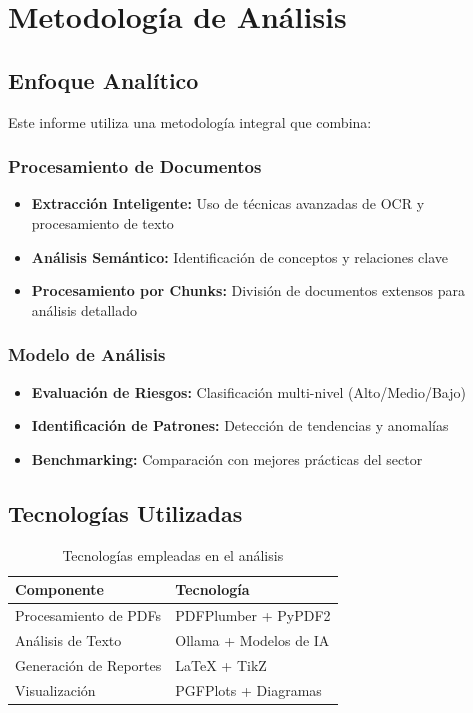 \documentclass[11pt]{report}
\begin{document}
\chapter{Metodología de Análisis}

\section{Enfoque Analítico}
Este informe utiliza una metodología integral que combina:

\subsection{Procesamiento de Documentos}
\begin{itemize}
    \item \textbf{Extracción Inteligente:} Uso de técnicas avanzadas de OCR y procesamiento de texto
    \item \textbf{Análisis Semántico:} Identificación de conceptos y relaciones clave
    \item \textbf{Procesamiento por Chunks:} División de documentos extensos para análisis detallado
\end{itemize}

\subsection{Modelo de Análisis}
\begin{itemize}
    \item \textbf{Evaluación de Riesgos:} Clasificación multi-nivel (Alto/Medio/Bajo)
    \item \textbf{Identificación de Patrones:} Detección de tendencias y anomalías
    \item \textbf{Benchmarking:} Comparación con mejores prácticas del sector
\end{itemize}

\section{Tecnologías Utilizadas}
\begin{table}[H]
    \centering
    \begin{tabular}{ll}
        \toprule
        \textbf{Componente} & \textbf{Tecnología} \\
        \midrule
        Procesamiento de PDFs & PDFPlumber + PyPDF2 \\
        Análisis de Texto & Ollama + Modelos de IA \\
        Generación de Reportes & LaTeX + TikZ \\
        Visualización & PGFPlots + Diagramas \\
        \bottomrule
    \end{tabular}
    \caption{Tecnologías empleadas en el análisis}
\end{table}
\end{document}
